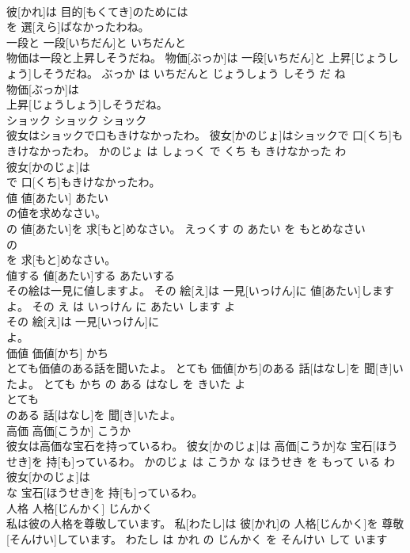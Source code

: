 \documentclass[8pt]{extreport}
\begin{document}
\begin{CJK}{UTF8}{min}
\\	彼[かれ]は 目的[もくてき]のためには
\\	を 選[えら]ばなかったわね。			
\\	一段と	一段[いちだん]と	いちだんと	
\\	物価は一段と上昇しそうだね。	物価[ぶっか]は 一段[いちだん]と 上昇[じょうしょう]しそうだね。	ぶっか は いちだんと じょうしょう しそう だ ね	
\\	物価[ぶっか]は
\\	上昇[じょうしょう]しそうだね。			
\\	ショック	ショック	ショック	
\\	彼女はショックで口もきけなかったわ。	彼女[かのじょ]はショックで 口[くち]もきけなかったわ。	かのじょ は しょっく で くち も きけなかった わ	
\\	彼女[かのじょ]は
\\	で 口[くち]もきけなかったわ。			
\\	値	値[あたい]	あたい	
\\	の値を求めなさい。	
\\	[えっくす]の 値[あたい]を 求[もと]めなさい。	えっくす の あたい を もとめなさい	
\\	[えっくす]の
\\	を 求[もと]めなさい。			
\\	値する	値[あたい]する	あたいする	
\\	その絵は一見に値しますよ。	その 絵[え]は 一見[いっけん]に 値[あたい]しますよ。	その え は いっけん に あたい します よ	
\\	その 絵[え]は 一見[いっけん]に
\\	よ。			
\\	価値	価値[かち]	かち	
\\	とても価値のある話を聞いたよ。	とても 価値[かち]のある 話[はなし]を 聞[き]いたよ。	とても かち の ある はなし を きいた よ	
\\	とても
\\	のある 話[はなし]を 聞[き]いたよ。			
\\	高価	高価[こうか]	こうか	
\\	彼女は高価な宝石を持っているわ。	彼女[かのじょ]は 高価[こうか]な 宝石[ほうせき]を 持[も]っているわ。	かのじょ は こうか な ほうせき を もって いる わ	
\\	彼女[かのじょ]は
\\	な 宝石[ほうせき]を 持[も]っているわ。			
\\	人格	人格[じんかく]	じんかく	
\\	私は彼の人格を尊敬しています。	私[わたし]は 彼[かれ]の 人格[じんかく]を 尊敬[そんけい]しています。	わたし は かれ の じんかく を そんけい して います	

\end{CJK}
\end{document}
